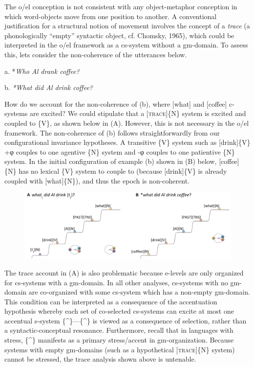    The o/el conception is not consistent with any object-metaphor conception in which word-objects move from one position to another. A conventional justification for a structural notion of movement involves the concept of a \textit{trace} (a phonologically “empty” syntactic object, cf. Chomsky, 1965), which could be interpreted in the o/el framework as a cs-system without a gm-domain. To assess this, lets consider the non-coherence of the utterances below.

  a.  *\textit{Who Al drank coffee?}

  b.  \textit{*What did Al drink coffee?}

  How do we account for the non-coherence of (b), where [what] and [coffee] c-systems are excited?  We could stipulate that a [\textsc{trace}]\{N\} system is excited and coupled to \{V\}, as shown below in (A). However, this is not necessary in the o/el framework. The non-coherence of (b) follows straightforwardly from our configurational invariance hypotheses. A transitive \{V\} system such as [drink]\{V\} +φ couples to one agentive \{N\} system and -φ couples to one patientive \{N\} system. In the initial configuration of example (b) shown in (B) below, [coffee]\{N\} has no lexical \{V\} system to couple to (because [drink]\{V\} is already coupled with [what]\{N\}), and thus the epoch is non-coherent.

  
\begin{figure}
\includegraphics[width=\textwidth]{figures/Tilsen-img161.png}
\caption{\missingcaption}
\label{fig:}
\end{figure}
 

  The trace account in (A) is also problematic because e-levels are only organized for cs-systems with a gm-domain. In all other analyses, cs-systems with no gm-domain are co-organized with some cs-system which has a non-empty gm-domain. This condition can be interpreted as a consequence of the accentuation hypothesis whereby each set of co-selected cs-systems can excite at most one accentual s-system \{\^{}\}—\{\^{}\} is viewed as a consequence of selection, rather than a syntactic-conceptual resonance. Furthermore, recall that in languages with stress, \{\^{}\} manifests as a primary stress/accent in gm-organization. Because systems with empty gm-domains (such as a hypothetical [\textsc{trace}]\{N\} system) cannot be stressed, the trace analysis shown above is untenable.

